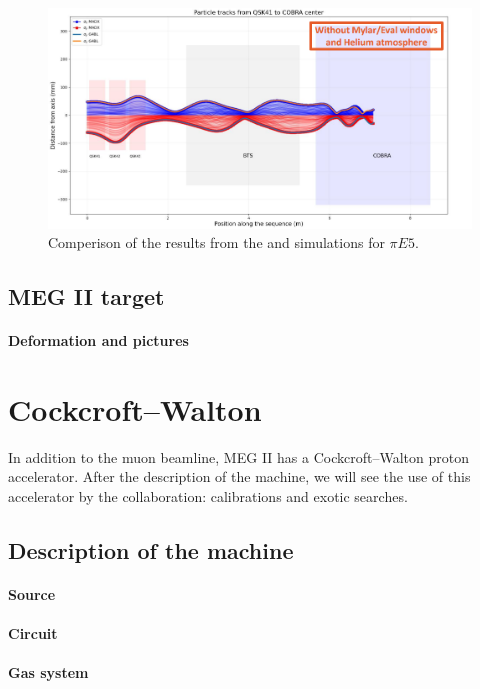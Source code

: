 \begin{refsection}
        \begin{figure}
            \centering
            \includegraphics[width = \textwidth]{Figures/MEG/madx_vs_g4b.png}
            \caption{Comperison of the results from the \gfb and \madx simulations for $\pi E5$.}
            \label{fig:madx_vs_g4b}
        \end{figure}
    
    \subsection{MEG II target}
        \paragraph{Deformation and pictures}
        
\section{Cockcroft–Walton}
    In addition to the muon beamline, MEG II has a Cockcroft–Walton proton accelerator. 
    After the description of the machine, we will see the use of this accelerator by the collaboration: calibrations and exotic searches. 

    \subsection{Description of the machine}
        \paragraph{Source}
        \paragraph{Circuit}
        \paragraph{Gas system}

\end{refsection}
